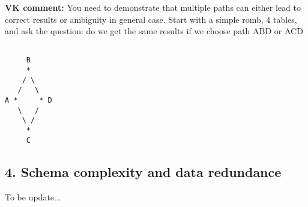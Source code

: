 {\bf VK comment:} You need to demonstrate that multiple paths can either lead to correct results
or ambiguity in general case. Start with a simple romb, 4 tables, and ask the question:
do we get the same results if we choose path ABD or ACD

\begin{verbatim}

     B
     *
    / \
   /   \
A *     * D
   \   /
    \ /
     *
     C

\end{verbatim}


\begin{center}
{\section*{{\normalsize\bf 4. Schema complexity and data redundance}}}
To be update...
\end{center}

